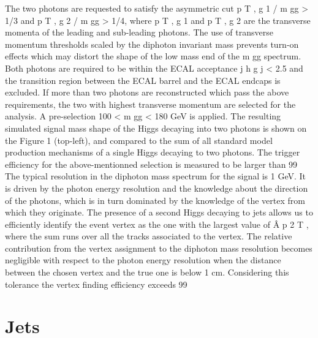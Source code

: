 The two photons are requested to satisfy the asymmetric cut
p
T
,
g
1
/
m
gg
>
1/3 and
p
T
,
g
2
/
m
gg
>
1/4, where
p
T
,
g
1
and
p
T
,
g
2
are the transverse momenta of the leading and sub-leading photons.
The use of transverse momentum thresholds scaled by the diphoton invariant mass prevents
turn-on effects which may distort the shape of the low mass end of the
m
gg
spectrum.  Both
photons are required to be within the ECAL acceptance
j
h
g
j
<
2.5 and the transition region
between the ECAL barrel and the ECAL endcaps is excluded.  If more than two photons are
reconstructed which pass the above requirements, the two with highest transverse momentum
are selected for the analysis.  A pre-selection 100
<
m
gg
<
180 GeV is applied.  The resulting
simulated signal mass shape of the Higgs decaying into two photons is shown on the Figure 1
(top-left), and compared to the sum of all standard model production mechanisms of a single
Higgs decaying to two photons.  The trigger efficiency for the above-mentionned selection is
measured to be larger than 99%
The typical resolution in the diphoton mass spectrum for the signal is 1 GeV. It is driven by
the photon energy resolution and the knowledge about the direction of the photons, which is
in turn dominated by the knowledge of the vertex from which they originate.  The presence
of a second Higgs decaying to jets allows us to efficiently identify the event vertex as the one
with the largest value of
Â
p
2
T
, where the sum runs over all the tracks associated to the vertex.
The relative contribution from the vertex assignment to the diphoton mass resolution becomes
negligible with respect to the photon energy resolution when the distance between the chosen
vertex and the true one is below 1 cm. Considering this tolerance the vertex finding efficiency
exceeds 99 %

\section{Jets\label{sec:jets}}



